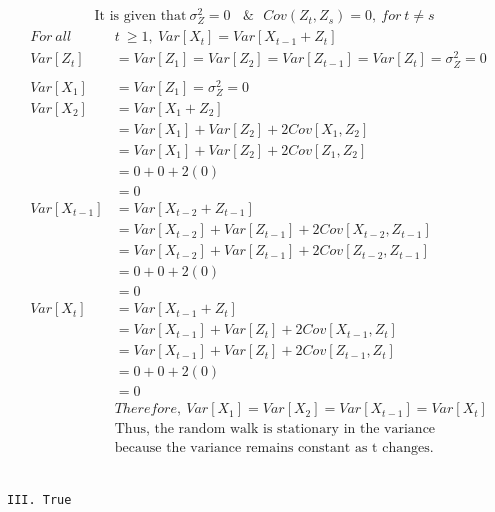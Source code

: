 \documentclass[
]{article}
\begin{document}
\[
\begin{aligned}
& \text{It is given that}\ σ_{Z}^2=0\  \ \ \ \& \ \ \ Cov(Z_{t}, Z_{s}) =0,\ for\ t \ne s 
\end{aligned}
\] \[ 
\begin{aligned}
For\ all\ &t\ \ge 1,\ Var[X_{t}] = Var[X_{t-1} + Z_{t}]\\
Var[Z_{t}] & = Var[Z_{1}] = Var[Z_{2}] = Var[Z_{t-1}] = Var[Z_{t}] =  \sigma^2_{Z} =0 \\ \\
Var[X_{1}]& = Var[Z_{1}] = \sigma^2_{Z} = 0\\
Var[X_{2}]& = Var[X_{1} + Z_{2}] \\
&= Var[X_{1}] + Var[Z_{2}] + 2Cov[X_{1}, Z_{2}]\\
&= Var[X_{1}] + Var[Z_{2}] + 2Cov[Z_{1}, Z_{2}]\\
&= 0 + 0 + 2(0)\\
&=0\\
Var[X_{t-1}]& = Var[X_{t-2} + Z_{t-1}] \\
&= Var[X_{t-2}] + Var[Z_{t-1}] + 2Cov[X_{t-2}, Z_{t-1}]\\
&= Var[X_{t-2}] + Var[Z_{t-1}] + 2Cov[Z_{t-2}, Z_{t-1}]\\
&= 0 + 0 + 2(0)\\
&=0\\
Var[X_{t}]& = Var[X_{t-1} + Z_{t}] \\
&= Var[X_{t-1}] + Var[Z_{t}] + 2Cov[X_{t-1}, Z_{t}]\\
&= Var[X_{t-1}] + Var[Z_{t}] + 2Cov[Z_{t-1}, Z_{t}]\\
&= 0 + 0 + 2(0)\\
&=0\\
& Therefore,\ Var[X_{1}] = Var[X_{2}] = Var[X_{t-1}] = Var[X_{t}]\\
& \text{Thus, the random walk is stationary in the variance}\\
& \text{because the variance remains constant as t changes.}
\end{aligned} 
\]\\

\begin{verbatim}
III. True
\end{verbatim}
\end{document}
